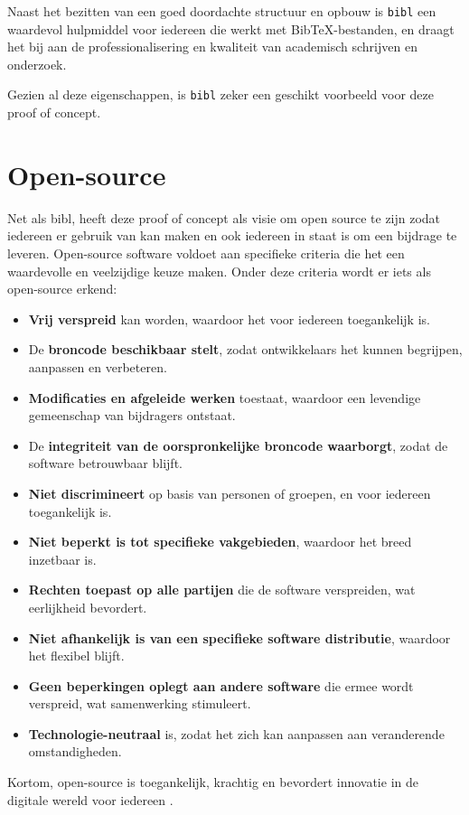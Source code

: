 Naast het bezitten van een goed doordachte structuur en opbouw is \texttt{bibl} een waardevol hulpmiddel voor iedereen die werkt met BibTeX-bestanden, en draagt het bij aan de professionalisering en kwaliteit van academisch schrijven en onderzoek.

Gezien al deze eigenschappen, is \texttt{bibl} zeker een geschikt voorbeeld voor deze proof of concept. 

\section{Open-source}
Net als bibl, heeft deze proof of concept als visie om open source te zijn zodat iedereen er gebruik van kan maken en ook iedereen in staat is om een bijdrage te leveren.
Open-source software voldoet aan specifieke criteria die het een waardevolle en veelzijdige keuze maken. Onder deze criteria wordt er iets als open-source erkend:
\begin{itemize}
    \item \textbf{Vrij verspreid} kan worden, waardoor het voor iedereen toegankelijk is.
    \item De \textbf{broncode beschikbaar stelt}, zodat ontwikkelaars het kunnen begrijpen, aanpassen en verbeteren.
    \item \textbf{Modificaties en afgeleide werken} toestaat, waardoor een levendige gemeenschap van bijdragers ontstaat.
    \item De \textbf{integriteit van de oorspronkelijke broncode waarborgt}, zodat de software betrouwbaar blijft.
    \item \textbf{Niet discrimineert} op basis van personen of groepen, en voor iedereen toegankelijk is.
    \item \textbf{Niet beperkt is tot specifieke vakgebieden}, waardoor het breed inzetbaar is.
    \item \textbf{Rechten toepast op alle partijen} die de software verspreiden, wat eerlijkheid bevordert.
    \item \textbf{Niet afhankelijk is van een specifieke software distributie}, waardoor het flexibel blijft.
    \item \textbf{Geen beperkingen oplegt aan andere software} die ermee wordt verspreid, wat samenwerking stimuleert.
    \item \textbf{Technologie-neutraal} is, zodat het zich kan aanpassen aan veranderende omstandigheden.
\end{itemize}

Kortom, open-source is toegankelijk, krachtig en bevordert innovatie in de digitale wereld voor iedereen \autocite{OpenSource2006}.

